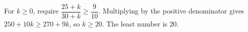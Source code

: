 For $k\ge0$, require $\dfrac{25+k}{30+k}\ge\dfrac{9}{10}$. Multiplying by the positive denominator gives $250+10k\ge270+9k$, so $k\ge20$. The least number is $\boxed{20}$.
